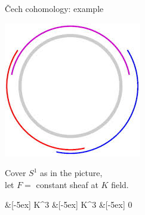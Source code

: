 \begin{frame}{\v{C}ech cohomology: example}
	\vspace{1ex}
	\begin{minipage}[b]{\textwidth}
		\begin{minipage}{.4\textwidth}
			\includegraphics[width=.6\columnwidth]{figures/s1_cover.png}
		\end{minipage}%
		\begin{minipage}{.6\textwidth}
			Cover $S^1$ as in the picture,\\let $F =$ constant sheaf at $K$ field.
			\begin{diagram*}
				  \arrow{r} \&[-5ex] K^3  \&[-5ex] K^3  \&[-5ex] 0
			\end{diagram*}
		\end{minipage}
	\end{minipage}
	\vspace{1ex}
\end{frame}
